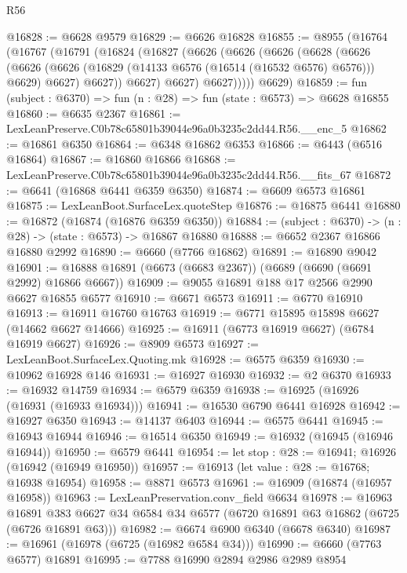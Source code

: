 \begin{lexlean}{R56}
\begin{coremodule}
@16828 := @6628 @9579
@16829 := @6626 @16828
@16855 := @8955
    (@16764
      (@16767
        (@16791
          (@16824
            (@16827
              (@6626
                (@6626
                  (@6626
                    (@6628
                      (@6626
                        (@6626
                          (@6626 (@16829 (@14133 @6576 (@16514 (@16532 @6576) @6576))) @6629)
                          @6627)
                        @6627))
                    @6627)
                  @6627)
                @6627)))))
      @6629)
@16859 := fun (subject : @6370) => fun (n : @28) => fun (state : @6573) => @6628 @16855
@16860 := @6635 @2367
@16861 := LexLeanPreserve.C0b78c65801b39044e96a0b3235c2dd44.R56.__enc_5
@16862 := @16861 @6350
@16864 := @6348 @16862 @6353
@16866 := @6443 (@6516 @16864)
@16867 := @16860 @16866
@16868 := LexLeanPreserve.C0b78c65801b39044e96a0b3235c2dd44.R56.__fits_67
@16872 := @6641 (@16868 @6441 @6359 @6350)
@16874 := @6609 @6573 @16861
@16875 := LexLeanBoot.SurfaceLex.quoteStep
@16876 := @16875 @6441
@16880 := @16872 (@16874 (@16876 @6359 @6350))
@16884 := (subject : @6370) -> (n : @28) -> (state : @6573) -> @16867 @16880
@16888 := @6652 @2367 @16866 @16880 @2992
@16890 := @6660 (@7766 @16862)
@16891 := @16890 @9042
@16901 := @16888 @16891 (@6673 (@6683 @2367)) (@6689 (@6690 (@6691 @2992) @16866 @6667))
@16909 := @9055 @16891 @188 @17 @2566 @2990 @6627 @16855 @6577
@16910 := @6671 @6573
@16911 := @6770 @16910
@16913 := @16911 @16760 @16763
@16919 := @6771 @15895 @15898 @6627 (@14662 @6627 @14666)
@16925 := @16911 (@6773 @16919 @6627) (@6784 @16919 @6627)
@16926 := @8909 @6573
@16927 := LexLeanBoot.SurfaceLex.Quoting.mk
@16928 := @6575 @6359
@16930 := @10962 @16928 @146
@16931 := @16927 @16930
@16932 := @2 @6370
@16933 := @16932 @14759
@16934 := @6579 @6359
@16938 := @16925 (@16926 (@16931 (@16933 @16934)))
@16941 := @16530 @6790 @6441 @16928
@16942 := @16927 @6350
@16943 := @14137 @6403
@16944 := @6575 @6441
@16945 := @16943 @16944
@16946 := @16514 @6350
@16949 := @16932 (@16945 (@16946 @16944))
@16950 := @6579 @6441
@16954 := let stop : @28 := @16941; @16926 (@16942 (@16949 @16950))
@16957 := @16913 (let value : @28 := @16768; @16938 @16954)
@16958 := @8871 @6573
@16961 := @16909 (@16874 (@16957 @16958))
@16963 := LexLeanPreservation.conv_field @6634
@16978 := @16963
    @16891
    @383
    @6627
    @34
    @6584
    @34
    @6577
    (@6720 @16891 @63 @16862 (@6725 (@6726 @16891 @63)))
@16982 := @6674 @6900 @6340 (@6678 @6340)
@16987 := @16961 (@16978 (@6725 (@16982 @6584 @34)))
@16990 := @6660 (@7763 @6577) @16891
@16995 := @7788 @16990 @2894 @2986 @2989 @8954

\end{coremodule}
\end{lexlean}

